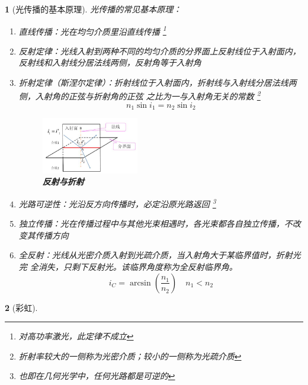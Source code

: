 \documentclass[UTF8]{report}
\theoremstyle{MyLineTheoremStyle} %
\theoremstyle{MyBlockTheoremStyle} %
\theoremstyle{MySubsubsectionStyle} %
\newtheorem{definition}{}
\begin{document}
\begin{definition}[光传播的基本原理]
光传播的常见基本原理：
\begin{enumerate}
    \item 直线传播：光在均匀介质里沿直线传播 \footnote{对高功率激光，此定律不成立}
    \item 反射定律：光线入射到两种不同的均匀介质的分界面上反射线位于入射面内，反射线和入射线分居法线两侧，反射角等于入射角
    \item 折射定律（斯涅尔定律）：折射线位于入射面内，折射线与入射线分居法线两侧，入射角的正弦与折射角的正弦
    之比为一与入射角无关的常数 \footnote{折射率较大的一侧称为光密介质；较小的一侧称为光疏介质}
    \begin{equation}
    n_1\sin i_1 = n_2 \sin i_2
    \end{equation}
    
    \begin{figure}[H]\centering
    \includegraphics[width=0.4\textwidth]{assets/1,2/image (44).jpg}
    \caption{\textbf{反射与折射}}\label{反射与折射}
    \end{figure}
    
    \item 光路可逆性：光沿反方向传播时，必定沿原光路返回 \footnote{也即在几何光学中，任何光路都是可逆的}
    \item 独立传播：光在传播过程中与其他光束相遇时，各光束都各自独立传播，不改变其传播方向
    \item 全反射：光线从光密介质入射到光疏介质，当入射角大于某临界值时，折射光完
    全消失，只剩下反射光。该临界角度称为全反射临界角。
    \begin{equation}
    i_C = \arcsin (\frac{n_1}{n_2})\quad n_1<n_2
    \end{equation}
\end{enumerate}
\end{definition}


\begin{definition}[彩虹]
\end{definition}
\end{document}
